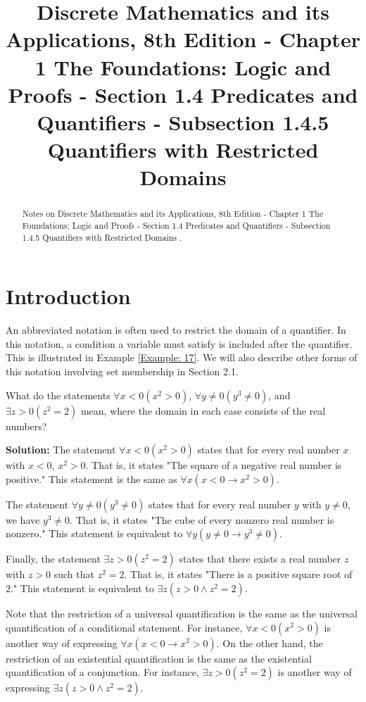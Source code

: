 \documentclass{Axon}
\title{Discrete Mathematics and its Applications, 8th Edition - Chapter 1 The Foundations: Logic and Proofs - Section 1.4 Predicates and Quantifiers - Subsection 1.4.5 Quantifiers with Restricted Domains}
\begin{document}
\maketitle
\makeauthor
\begin{abstract}
Notes on Discrete Mathematics and its Applications, 8th Edition - Chapter 1 The Foundations: Logic and Proofs - Section 1.4 Predicates and Quantifiers - Subsection 1.4.5 Quantifiers with Restricted Domains \cite{Rosen}.
\end{abstract}
\section{Introduction}
An abbreviated notation is often used to restrict the domain of a quantifier. In this notation, a condition a variable must satisfy is included after the quantifier. This is illustrated in Example \ref{Example: 17}. We will also describe other forms of this notation involving set membership in Section 2.1.

\begin{example}\label{Example: 17}
    What do the statements \(\forall x < 0 (x^2 > 0)\), \(\forall y \neq 0 (y^3 \neq 0)\), and \(\exists z > 0 (z^2 = 2)\) mean, where the domain in each case consists of the real numbers?

    \noindent
    \textbf{Solution:}
    The statement \(\forall x < 0 (x^2 > 0)\) states that for every real number \(x\) with \(x < 0\), \(x^2 > 0\). That is, it states "The square of a negative real number is positive." This statement is the same as \(\forall x(x < 0 \to x^2 > 0)\).

    The statement \(\forall y \neq 0(y^3 \neq 0)\) states that for every real number \(y\) with \(y \neq 0\), we have \(y^3 \neq 0\). That is, it states "The cube of every nonzero real number is nonzero." This statement is equivalent to \(\forall y(y \neq 0 \to y^3 \neq 0)\).

    Finally, the statement \(\exists z > 0 (z^2 = 2)\) states that there exists a real number \(z\) with \(z > 0\) such that \(z^2 = 2\). That is, it states "There is a positive square root of \(2\)." This statement is equivalent to \(\exists z(z > 0 \land z^2 = 2)\).
\end{example}

Note that the restriction of a universal quantification is the same as the universal quantification of a conditional statement. For instance, \(\forall x < 0 (x^2 > 0)\) is another way of expressing \(\forall x (x < 0 \to x^2 > 0)\). On the other hand, the restriction of an existential quantification is the same as the existential quantification of a conjunction. For instance, \(\exists z > 0 (z^2 = 2)\) is another way of expressing \(\exists z (z > 0 \land z^2 = 2)\).

\printbibliography
\end{document}
